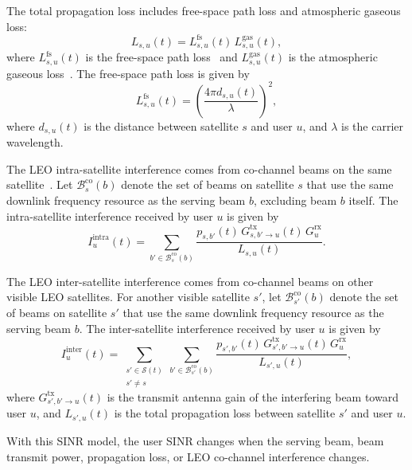 The total propagation loss includes free-space path loss and atmospheric gaseous loss:
\begin{equation*}
L_{s,u}(t)=L_{s,u}^{\mathrm{fs}}(t)\,L_{s,u}^{\mathrm{gas}}(t),
\end{equation*}
where $L_{s,u}^{\mathrm{fs}}(t)$ is the free-space path loss~\cite{itur_p525} and $L_{s,u}^{\mathrm{gas}}(t)$ is the atmospheric gaseous loss~\cite{itur_p676}. The free-space path loss is given by
\begin{equation*}
L_{s,u}^{\mathrm{fs}}(t)=\left(\frac{4\pi d_{s,u}(t)}{\lambda}\right)^2,
\end{equation*}
where $d_{s,u}(t)$ is the distance between satellite $s$ and user $u$, and $\lambda$ is the carrier wavelength.

The LEO intra-satellite interference comes from co-channel beams on the same satellite~\cite{cocco2014cochannel}. Let $\mathcal{B}_s^{\mathrm{co}}(b)$ denote the set of beams on satellite $s$ that use the same downlink frequency resource as the serving beam $b$, excluding beam $b$ itself. The intra-satellite interference received by user $u$ is given by
\begin{equation*}
I_u^{\mathrm{intra}}(t)=\sum_{b'\in\mathcal{B}_s^{\mathrm{co}}(b)}
\frac{p_{s,b'}(t)\,G^{\mathrm{tx}}_{s,b'\to u}(t)\,G^{\mathrm{rx}}_u}{L_{s,u}(t)}.
\end{equation*}

The LEO inter-satellite interference comes from co-channel beams on other visible LEO satellites. For another visible satellite $s'$, let $\mathcal{B}_{s'}^{\mathrm{co}}(b)$ denote the set of beams on satellite $s'$ that use the same downlink frequency resource as the serving beam $b$. The inter-satellite interference received by user $u$ is given by
\begin{equation*}
I_u^{\mathrm{inter}}(t)=\sum_{\substack{s'\in\mathcal{S}(t)\\ s'\neq s}}
\sum_{b'\in\mathcal{B}_{s'}^{\mathrm{co}}(b)}
\frac{p_{s',b'}(t)\,G^{\mathrm{tx}}_{s',b'\to u}(t)\,G^{\mathrm{rx}}_u}{L_{s',u}(t)},
\end{equation*}
where $G^{\mathrm{tx}}_{s',b'\to u}(t)$ is the transmit antenna gain of the interfering beam toward user $u$, and $L_{s',u}(t)$ is the total propagation loss between satellite $s'$ and user $u$.

With this SINR model, the user SINR changes when the serving beam, beam transmit power, propagation loss, or LEO co-channel interference changes.

